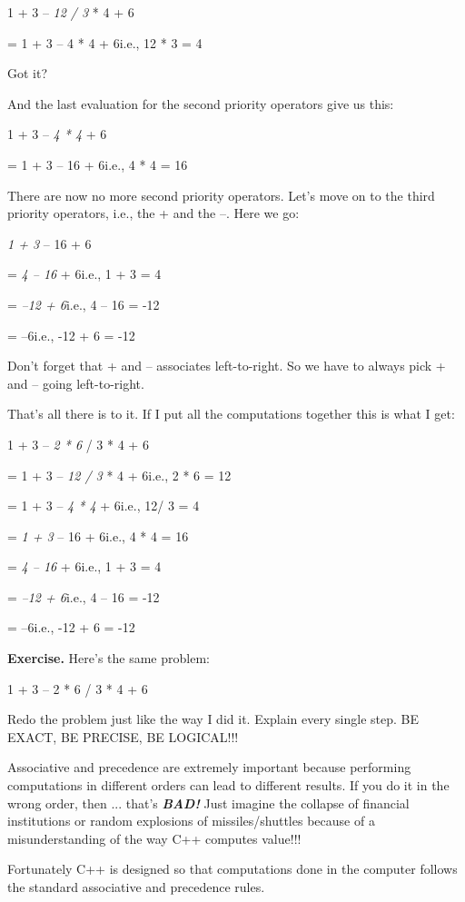 \documentclass[
]{article}
\begin{document}
1 + 3 -- \emph{12 / 3} * 4 + 6

= 1 + 3 -- 4 * 4 + 6i.e., 12 * 3 = 4

Got it?

And the last evaluation for the second priority operators give us this:

1 + 3 -- \emph{4 * 4} + 6

= 1 + 3 -- 16 + 6i.e., 4 * 4 = 16

There are now no more second priority operators. Let's move on to the
third priority operators, i.e., the + and the --. Here we go:

\emph{1 + 3} -- 16 + 6

= \emph{4 -- 16} + 6i.e., 1 + 3 = 4

= \emph{--12 + 6}i.e., 4 -- 16 = -12

= --6i.e., -12 + 6 = -12

Don't forget that + and -- associates left-to-right. So we have to
always pick + and -- going left-to-right.

That's all there is to it. If I put all the computations together this
is what I get:

1 + 3 -- \emph{2 * 6} / 3 * 4 + 6

= 1 + 3 -- \emph{12 / 3} * 4 + 6i.e., 2 * 6 = 12

= 1 + 3 -- \emph{4 * 4} + 6i.e., 12/ 3 = 4

= \emph{1 + 3} -- 16 + 6i.e., 4 * 4 = 16

= \emph{4 -- 16} + 6i.e., 1 + 3 = 4

= \emph{--12 + 6}i.e., 4 -- 16 = -12

= --6i.e., -12 + 6 = -12

\textbf{Exercise.} Here's the same problem:

1 + 3 -- 2 * 6 / 3 * 4 + 6

Redo the problem just like the way I did it. Explain every single step.
BE EXACT, BE PRECISE, BE LOGICAL!!!

Associative and precedence are extremely important because performing
computations in different orders can lead to different results. If you
do it in the wrong order, then ... that's \emph{\textbf{BAD!}} Just
imagine the collapse of financial institutions or random explosions of
missiles/shuttles because of a misunderstanding of the way C++ computes
value!!!

Fortunately C++ is designed so that computations done in the computer
follows the standard associative and precedence rules.
\end{document}
